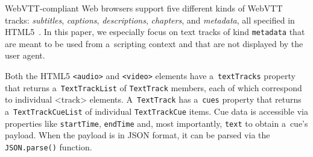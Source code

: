 \documentclass{sig-alternate}
\begin{document}
\begin{comment}
\begin{table}[b!]\footnotesize
\begin{tabular}{ r p{5.5cm} } %
\textbf{WebVTT Kind} & \textbf{Description and Default Behavior}\\

\texttt{subtitles} & Transcription or translation of speech,
suitable for when sound is available but not understood.
Overlaid on the video.\\

\texttt{captions} & Transcription or translation of the dialogue,
sound effects, and other relevant audio information,
suitable for when sound is unavailable or not clearly audible.
Overlaid on the video;
labeled as appropriate for the hard-of-hearing.\\

\texttt{descriptions} & Textual descriptions of the video component
of the media resource, intended for audio synthesis
when the visual component is obscured, unavailable, or unusable.
Synthesized as audio.\\

\texttt{chapters} & Chapter titles, intended to be used for navigating
the media resource. Displayed as an interactive (potentially nested)
list in the user agent's interface.\\

\texttt{metadata} & Metadata intended for use from script context.
Not displayed by user agent.\\
\end{tabular}
  \caption{WebVTT text track kinds in HTML5~\cite{berjon2013html5}}
  \label{table:texttrackkinds}
\end{table}
\end{comment}

WebVTT-compliant Web browsers %
support five different kinds of
WebVTT tracks: \emph{subtitles}, \emph{captions},
\emph{descriptions}, \emph{chapters}, and \emph{metadata},
all specified in HTML5~\cite{berjon2013html5}.
In this paper, we especially focus on
text tracks of kind \texttt{metadata}
that are meant to be used from a~scripting context and
that are not displayed by the user agent.

Both the HTML5 \texttt{<audio>} and \texttt{<video>} elements
have a~\texttt{textTracks} property
that returns a~\texttt{TextTrackList} of
\texttt{TextTrack} members, each of which correspond
to individual <track> elements.
A~\texttt{TextTrack} has a~\texttt{cues} property
that returns a~\texttt{TextTrackCueList} of individual
\texttt{TextTrackCue} items.
Cue data is accessible via properties like
\texttt{startTime}, \texttt{endTime} and,
most importantly, \texttt{text} to obtain a~cue's payload.
When the payload is in JSON format,
it can be parsed via the
\texttt{JSON.parse()} function.
\end{document}
